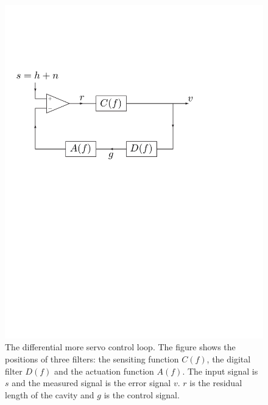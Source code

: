 \begin{figure}[p]
\label{f:darmloop}
\begin{center}
\includegraphics[width=\linewidth]{figures/inspiral/darm}
\end{center}
\caption[Differential mode control servo loop]{%
The differential more servo control loop. The figure shows the positions of
three filters: the sensiting function $C(f)$, the digital filter $D(f)$ and
the actuation function $A(f)$. The input signal is $s$ and the measured signal
is the error signal $v$. $r$ is the residual length of the cavity and $g$ is
the control signal.
}
\end{figure}

